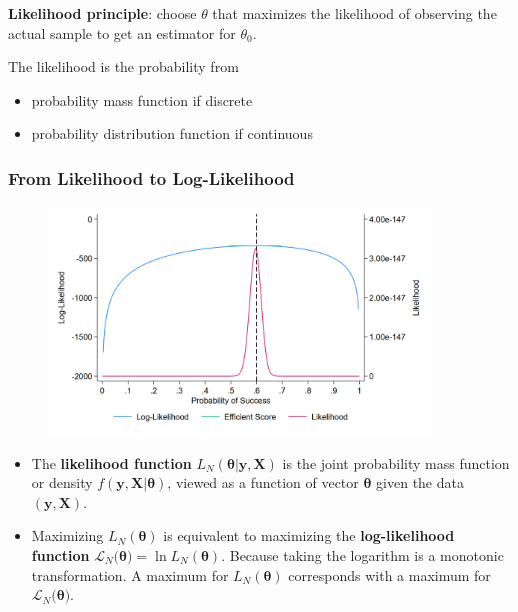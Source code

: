 \documentclass[a4paper,12pt]{article}
\begin{document}
\textbf{Likelihood principle}: choose $\theta$ that maximizes the likelihood of observing the actual sample to get an estimator for $\theta_0$.

The likelihood is the probability from
\begin{itemize}
	\item probability mass function if discrete
	\item probability distribution function if continuous
\end{itemize}



\subsubsection*{From Likelihood to Log-Likelihood}

\begin{figure}[H]
\begin{center}
{\includegraphics[width=0.9\textwidth]{figures/ll_500}}\label{f1}
\end{center}
\end{figure}

\begin{itemize}
	\item The \textbf{likelihood function} $L_N(\boldsymbol{\theta}|\boldsymbol{y},\boldsymbol{X})$ is the joint probability mass function or density $f(\boldsymbol{y},\boldsymbol{X}|\boldsymbol{\theta})$, viewed as a function of vector $\boldsymbol{\theta}$ given the data $(\boldsymbol{y},\boldsymbol{X})$.

	\item Maximizing $L_N(\boldsymbol{\theta})$ is equivalent to maximizing the \textbf{log-likelihood function} $\mathcal{L}_N(\boldsymbol{\theta)}=\ln L_N(\boldsymbol{\theta})$. Because taking the logarithm is a monotonic transformation. A maximum for $L_N(\boldsymbol{\theta})$ corresponds with a maximum for $\mathcal{L}_N(\boldsymbol{\theta)}$.

\end{itemize}
\end{document}
